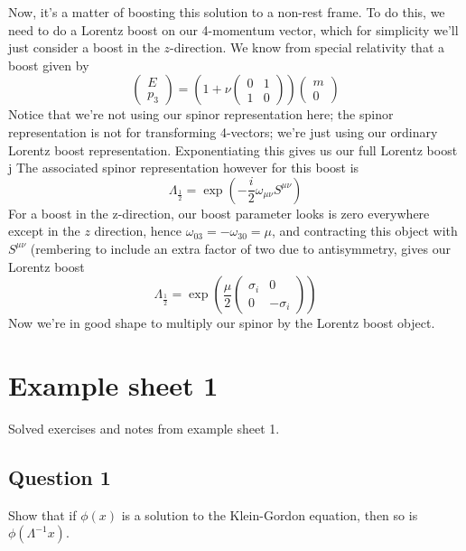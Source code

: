 \documentclass[11pt, oneside]{article}   	%
\theoremstyle{newline}
\theoremstyle{newline}
\theoremstyle{newline}
\theoremstyle{newline}
\theoremstyle{newline}
\begin{document}
Now, it's a matter of boosting this solution to a non-rest frame. To do this, we need to do a Lorentz boost on our 4-momentum vector, which for simplicity we'll just consider a boost in the $z$-direction. We know from special relativity that a boost given by 
\[ 
\begin{pmatrix} 
E \\ p_3 
\end{pmatrix}  = \left(  1 + \nu \begin{pmatrix} 0 & 1 \\ 1 & 0 \end{pmatrix} \right)  \begin{pmatrix} m \\ 0 \end{pmatrix} \] 
Notice that we're not using our spinor representation here; the spinor representation is not for transforming 4-vectors; we're just using our ordinary Lorentz boost representation. Exponentiating this gives us our full Lorentz boost j The associated spinor representation however for this boost is 
\[
\Lambda_{\frac{1}{2}} = \exp \left(  - \frac{i}{2} \omega_{ \mu \nu } S^{\mu \nu} \right) 
\]
For a boost in the z-direction, our boost parameter looks is zero everywhere except in the $z$ direction, hence $\omega_{03}  = - \omega_{30}  = \mu$, and contracting this object with $S^{ \mu \nu} $ (rembering to include an extra factor of two due to antisymmetry, gives our Lorentz boost \[ 
\Lambda_{\frac{1}{ 2}} = \exp \left(  \frac{ \mu}{ 2} \begin{pmatrix} \sigma_i & 0 \\ 0 &  -\sigma_i \end{pmatrix} \right)  \] 
Now we're in good shape to multiply our spinor by the Lorentz boost object.  


\pagebreak 
\section{Example sheet 1}

Solved exercises and notes from example sheet 1. 

\subsection{Question 1}
Show that if $\phi(x)$ is a solution to the Klein-Gordon equation, then so is $\phi(\Lambda^{-1} x )$. 
\end{document}
